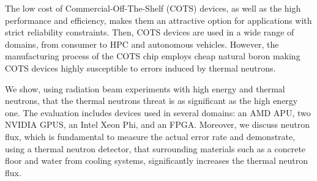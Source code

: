 The low cost of Commercial-Off-The-Shelf (COTS) devices, as well as the high performance and efficiency, makes them an attractive option for applications with strict reliability constraints. Then, COTS devices are used in a wide range of domains, from consumer to HPC and autonomous vehicles. However, the manufacturing process of the COTS chip employs cheap natural boron making COTS devices highly susceptible to errors induced by thermal neutrons.

We show, using radiation beam experiments with high energy and thermal neutrons, that the thermal neutrons threat is as significant as the high energy one. The evaluation includes devices used in several domains: an AMD APU, two NVIDIA GPUS, an Intel Xeon Phi, and an FPGA. Moreover, we discuss neutron flux, which is fundamental to measure the actual error rate and demonstrate, using a thermal neutron detector, that surrounding materials such as a concrete floor and water from cooling systems, significantly increases the thermal neutron flux.

% 

